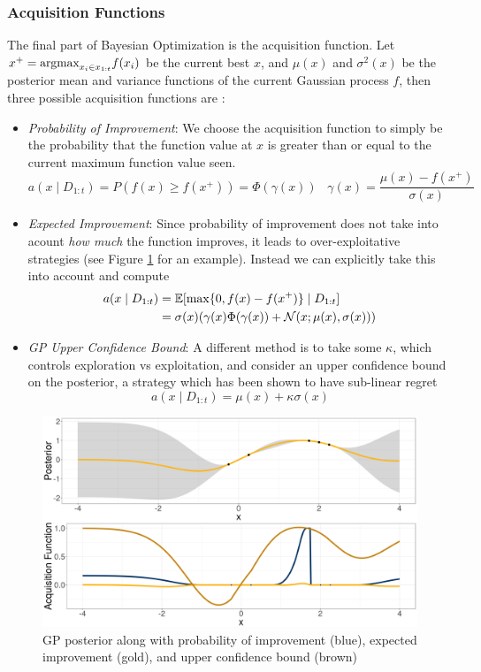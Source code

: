 \documentclass[11pt]{article}
\begin{document}
\subsubsection{Acquisition Functions}
The final part of Bayesian Optimization is the acquisition function. Let $x^+ = \text{argmax}_{x_i \in x_{1:t}} f(x_i)$ be the current best $x$, and $\mu(x)$ and $\sigma^2(x)$ be the posterior mean and variance functions of the current Gaussian process $f$, then three possible acquisition functions are \cite{Snoek2012}:
\begin{itemize}
\item {\it Probability of Improvement}: We choose the acquisition function to simply be the probability that the function value at $x$ is greater than or equal to the current maximum function value seen.
\begin{equation}
a(x \mid D_{1:t}) = P(f(x) \geq f(x^+)) = \Phi(\gamma(x)) \;\;\; \gamma(x) = \frac{\mu(x) - f(x^+)}{\sigma(x)}
\end{equation}
\item {\it Expected Improvement}: Since probability of improvement does not take into acount {\it how much} the function improves, it leads to over-exploitative strategies (see Figure \ref{fig:acq_funcs} for an example). Instead we can explicitly take this into account and compute
\begin{equation}
\begin{split}
a(x \mid D_{1:t}) & = \mathbb{E}[\max \{0, f(x) - f(x^+)\} \mid D_{1:t}]\\
& = \sigma(x)(\gamma(x)\Phi(\gamma(x)) + \mathcal{N}(x;\mu(x), \sigma(x)))
\end{split}
\end{equation}
\item { \it GP Upper Confidence Bound}: A different method is to take some $\kappa$, which controls exploration vs exploitation, and consider an upper confidence bound on the posterior, a strategy which has been shown to have sub-linear regret \cite{Srinivas2010}
\begin{equation}
a(x \mid D_{1:t}) = \mu(x) + \kappa \sigma(x)
\end{equation}
\end{itemize}
\begin{figure}
\includegraphics[width=\textwidth]{acq_funcs.png}
\caption{GP posterior along with probability of improvement (blue), expected improvement (gold), and upper confidence bound (brown)}
\label{fig:acq_funcs}
\end{figure}
\end{document}
